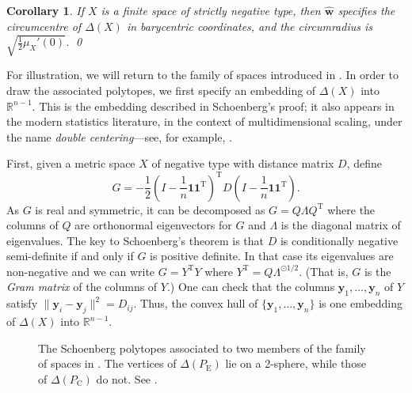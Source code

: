 \documentclass[a4paper, oneside, reqno]{amsart}
\newtheorem{cor}[theorem]{Corollary}
\theoremstyle{definition}
\theoremstyle{remark}
\numberwithin{equation}{section}
\renewcommand{\vec}{\mathbf}
\newcommand{\onevector}{\mathbf{1}}
\newcommand{\onematrix}{\onevector \onevector^\transpose}
\newcommand{\transpose}{\mathrm{T}}
\newcommand{\R}{\mathbb{R}}
\newcommand{\micro}{\widehat{\vec{w}}}
\begin{document}
\begin{cor}
\label{cor:strict_neg_type_schoenberg_sphere}
If \(X\) is a finite space of strictly negative type, then \(\micro\) specifies the circumcentre of \(\Delta(X)\) in barycentric coordinates, and the circumradius is 
\(\sqrt{\frac{1}{2} \mu_X'(0)}\). \qed
\end{cor}

For illustration, we will return to the family of spaces introduced in . In order to draw the associated polytopes, we first specify an embedding of \(\Delta(X)\) into \(\R^{n-1}\). This is  the embedding described in Schoenberg's proof; it also appears in the modern statistics literature, in the context of multidimensional scaling, under the name \emph{double centering}---see, for example, \cite[\S12.1]{BorgGroenen}.

First, given a metric space \(X\) of negative type with distance matrix \(D\), define 
\[G = -\frac{1}{2} \left(I - \frac{1}{n} \onematrix\right)^\transpose D \left(I - \frac{1}{n} \onematrix\right).\]
As \(G\) is real and symmetric, it can be decomposed as \(G = Q \Lambda Q^\transpose\) where the columns of \(Q\) are orthonormal eigenvectors for \(G\) and \(\Lambda\) is the diagonal matrix of eigenvalues. The key to Schoenberg's theorem is that \(D\) is conditionally negative semi-definite if and only if \(G\) is positive definite. In that case its eigenvalues are non-negative and we can write \(G = Y^\transpose Y\) where \(Y^\transpose = Q \Lambda^{\odot 1/2}\). (That is, \(G\) is the \emph{Gram matrix} of the columns of \(Y\).) One can check that the columns \(\vec{y}_1,\ldots, \vec{y}_n\) of \(Y\) satisfy \(\|\vec{y}_i - \vec{y}_j\|^2 = D_{ij}\). Thus, the convex hull of \(\{\vec{y}_1,\ldots, \vec{y}_n\}\) is one embedding of \(\Delta(X)\) into \(\R^{n-1}\).

\begin{figure}
    \centering
    
    \quad\quad\quad
    
    \caption{
    The Schoenberg polytopes associated to two members of the family of spaces in . The vertices of \(\Delta(P_{\mathrm{E}})\) lie on a 2-sphere, while those of \(\Delta(P_{\mathrm{C}})\) do not. See .
    }
    \label{fig:schoenberg_polytope}
\end{figure}
\end{document}
